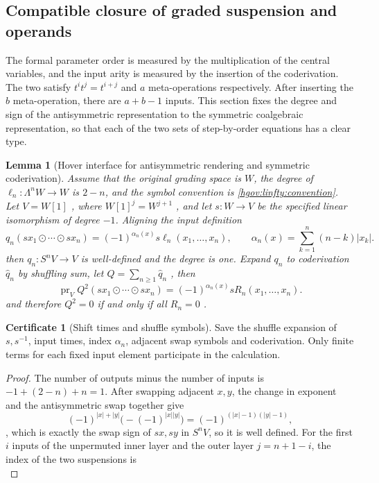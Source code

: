 \documentclass[12pt,a4paper,openany,notitlepage]{report}
\theoremstyle{plain}
\newtheorem{lemma}[theorem]{Lemma}
\theoremstyle{definition}
\newtheorem*{certificate}{Certificate}
\theoremstyle{remark}
\def\mathcal#1{#1}\def\mathsf#1{#1}\def\mathbb#1{#1}%
\begin{document}
\begin{CJK*}
\section { Compatible closure of graded suspension and operands }\label{exp:hom:arity-grading}


The formal parameter order is measured by the multiplication of the central variables, and the input arity is measured by the insertion of the coderivation. The two satisfy $t^it^j=t^{i+j}$ and $a$ meta-operations respectively. After inserting the $b$ meta-operation, there are $a+b-1$ inputs. This section fixes the degree and sign of the antisymmetric representation to the symmetric coalgebraic representation, so that each of the two sets of step-by-order equations has a clear type.

\begin{lemma}
[Hover interface for antisymmetric rendering and symmetric coderivation]\label{hgov:lem-suspension}
Assume that the original grading space is $W$, the degree of $\ell_n:\Lambda^nW\to W$ is $2-n$, and the symbol convention is \ref{hgov:linfty:convention}. Let $V=W[1]$ , where $W[1]^j=W^{j+1}$ , and let $s:W\to V$ be the specified linear isomorphism of degree $-1$. Aligning the input definition \[
 q_n(sx_1\odot\cdots\odot sx_n)
 =(-1)^{\alpha_n(x)}s\ell_n(x_1,\ldots,x_n),
 \qquad
 \alpha_n(x)=\sum_{k=1}^{n}(n-k)|x_k|.
\] then $q_n:S^nV\to V$ is well-defined and the degree is one. Expand $q_n$ to coderivation $\widehat q_n$ by shuffling sum, let $Q=\sum_{n\ge1}\widehat q_n$ , then \[
 \operatorname{pr}_V Q^2(sx_1\odot\cdots\odot sx_n)
 =(-1)^{\alpha_n(x)}s\mathcal R_n(x_1,\ldots,x_n).
\] and therefore $Q^2=0$ if and only if all $\mathcal R_n=0$ .\end{lemma}
\begin{certificate}
[Shift times and shuffle symbols]Save the shuffle expansion of $s,s^{-1}$, input times, index $\alpha_n$, adjacent swap symbols and coderivation. Only finite terms for each fixed input element participate in the calculation.\end{certificate}
\begin{proof}
The number of outputs minus the number of inputs is $-1+(2-n)+n=1$. After swapping adjacent $x,y$, the change in exponent and the antisymmetric swap together give \[
 (-1)^{|x|+|y|}\bigl(-(-1)^{|x||y|}\bigr)
 =(-1)^{(|x|-1)(|y|-1)},
\], which is exactly the swap sign of $sx,sy$ in $S^nV$, so it is well defined. For the first $i$ inputs of the unpermuted inner layer and the outer layer $j=n+1-i$, the index of the two suspensions is \[
\]
\end{proof}
\end{CJK*}
\end{document}
